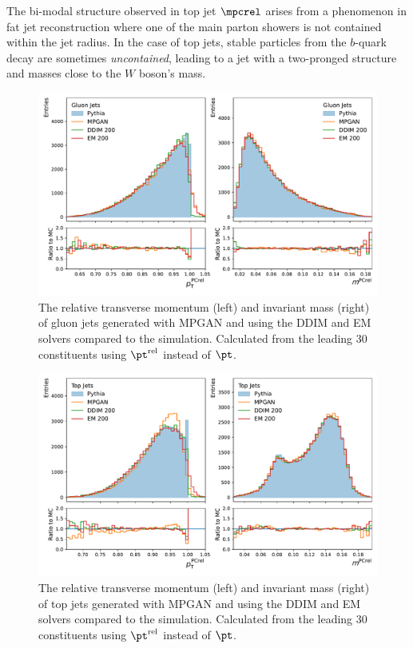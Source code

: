 The bi-modal structure observed in top jet $\mpcrel$ arises from a phenomenon in fat jet reconstruction where one of the main parton showers is not contained within the jet radius.
In the case of top jets, stable particles from the $b$-quark decay are sometimes \textit{uncontained}, leading to a jet with a two-pronged structure and masses close to the $W$ boson's mass.

\begin{figure}[hbpt]
    \centering
    \includegraphics[width=.75\textwidth]{Figures/jet_generation/jedi/gluon/jet_features_rel.pdf}
    \caption{The relative transverse momentum (left) and invariant mass (right) of gluon jets generated with MPGAN and \pcjedi using the DDIM and EM solvers compared to the \pythia simulation. Calculated from the leading 30 \pt constituents using $\pt^\text{rel}$ instead of $\pt$.}
    \label{fig:kinematics_gluon}
\end{figure}

\begin{figure}[hbpt]
    \centering
    \includegraphics[width=.75\textwidth]{Figures/jet_generation/jedi/top/jet_features_rel.pdf}
    \caption{The relative transverse momentum (left) and invariant mass (right) of top jets generated with MPGAN and \pcjedi using the DDIM and EM solvers compared to the \pythia simulation. Calculated from the leading 30 \pt constituents using $\pt^\text{rel}$ instead of $\pt$.}
    \label{fig:kinematics_top}
\end{figure}

